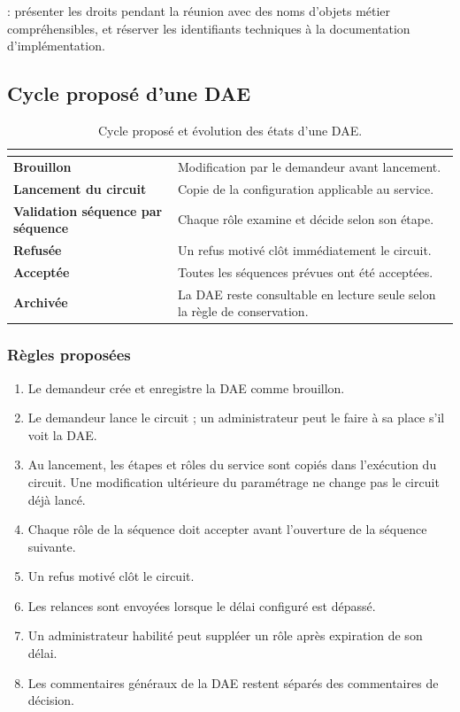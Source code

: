 \begin{tcolorbox}[enhanced,colback=vertClairDAE,colframe=vertDAE,boxrule=0.6pt,arc=1.5mm]
\recommande{} : présenter les droits pendant la réunion avec des noms d'objets métier compréhensibles, et réserver les identifiants techniques à la documentation d'implémentation.
\end{tcolorbox}

\subsection{Cycle proposé d'une DAE}

\begin{table}[htbp]
\centering
\small
\begin{tabularx}{0.94\textwidth}{>{\bfseries}p{}Y}
\toprule
{}
 &  \\
\midrule
Brouillon & Modification par le demandeur avant lancement. \\
Lancement du circuit & Copie de la configuration applicable au service. \\
Validation séquence par séquence & Chaque rôle examine et décide selon son étape. \\
Refusée & Un refus motivé clôt immédiatement le circuit. \\
Acceptée & Toutes les séquences prévues ont été acceptées. \\
Archivée & La DAE reste consultable en lecture seule selon la règle de conservation. \\
\bottomrule
\end{tabularx}
\caption{Cycle proposé et évolution des états d'une DAE.}
\label{tab:cycle-synthetique}
\end{table}

\subsubsection{Règles proposées}

\begin{enumerate}
  \item Le demandeur crée et enregistre la DAE comme brouillon.
  \item Le demandeur lance le circuit ; un administrateur peut le faire à sa place s'il voit la DAE.
  \item Au lancement, les étapes et rôles du service sont copiés dans l'exécution du circuit. Une modification ultérieure du paramétrage ne change pas le circuit déjà lancé.
  \item Chaque rôle de la séquence doit accepter avant l'ouverture de la séquence suivante.
  \item Un refus motivé clôt le circuit.
  \item Les relances sont envoyées lorsque le délai configuré est dépassé.
  \item Un administrateur habilité peut suppléer un rôle après expiration de son délai.
  \item Les commentaires généraux de la DAE restent séparés des commentaires de décision.
\end{enumerate}


